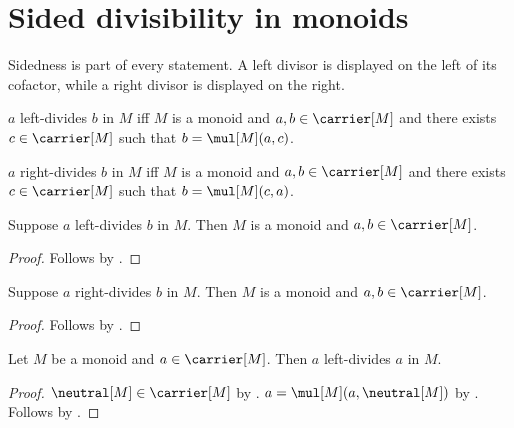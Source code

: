 

\section{Sided divisibility in monoids}

Sidedness is part of every statement.  A left divisor is displayed on the
left of its cofactor, while a right divisor is displayed on the right.

\begin{definition}\label{left_monoid_divisibility}
    $a$ left-divides $b$ in $M$ iff
        $M$ is a monoid and $a,b\in\carrier[M]$ and
        there exists $c\in\carrier[M]$ such that
            $b=\mul[M](a,c)$.
\end{definition}

\begin{definition}\label{right_monoid_divisibility}
    $a$ right-divides $b$ in $M$ iff
        $M$ is a monoid and $a,b\in\carrier[M]$ and
        there exists $c\in\carrier[M]$ such that
            $b=\mul[M](c,a)$.
\end{definition}

\begin{proposition}\label{left_monoid_divisibility_guards}
    Suppose $a$ left-divides $b$ in $M$.
    Then $M$ is a monoid and $a,b\in\carrier[M]$.
\end{proposition}
\begin{proof}
    Follows by .
\end{proof}

\begin{proposition}\label{right_monoid_divisibility_guards}
    Suppose $a$ right-divides $b$ in $M$.
    Then $M$ is a monoid and $a,b\in\carrier[M]$.
\end{proposition}
\begin{proof}
    Follows by .
\end{proof}

\begin{proposition}\label{left_monoid_divisibility_reflexive}
    Let $M$ be a monoid and $a\in\carrier[M]$.
    Then $a$ left-divides $a$ in $M$.
\end{proposition}
\begin{proof}
    $\neutral[M]\in\carrier[M]$ by .
    $a=\mul[M](a,\neutral[M])$ by .
    Follows by .
\end{proof}

